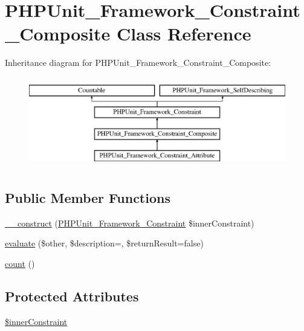 \hypertarget{class_p_h_p_unit___framework___constraint___composite}{}\section{P\+H\+P\+Unit\+\_\+\+Framework\+\_\+\+Constraint\+\_\+\+Composite Class Reference}
\label{class_p_h_p_unit___framework___constraint___composite}
Inheritance diagram for P\+H\+P\+Unit\+\_\+\+Framework\+\_\+\+Constraint\+\_\+\+Composite\+:\begin{figure}[H]
\begin{center}
\leavevmode
\includegraphics[height=4.000000cm]{class_p_h_p_unit___framework___constraint___composite}
\end{center}
\end{figure}
\subsection*{Public Member Functions}
\begin{DoxyCompactItemize}
\item 
\mbox{\hyperlink{class_p_h_p_unit___framework___constraint___composite_a27c4ee0925757fb19b6261a515d7d995}{\+\_\+\+\_\+construct}} (\mbox{\hyperlink{class_p_h_p_unit___framework___constraint}{P\+H\+P\+Unit\+\_\+\+Framework\+\_\+\+Constraint}} \$inner\+Constraint)
\item 
\mbox{\hyperlink{class_p_h_p_unit___framework___constraint___composite_a4c184790087f7d42c3daf0d0180fe5fb}{evaluate}} (\$other, \$description=\textquotesingle{}\textquotesingle{}, \$return\+Result=false)
\item 
\mbox{\hyperlink{class_p_h_p_unit___framework___constraint___composite_ac751e87b3d4c4bf2feb03bee8b092755}{count}} ()
\end{DoxyCompactItemize}
\subsection*{Protected Attributes}
\begin{DoxyCompactItemize}
\item 
\mbox{\hyperlink{class_p_h_p_unit___framework___constraint___composite_afa3581b2deec1029bc9edc3111543af9}{\$inner\+Constraint}}
\end{DoxyCompactItemize}
